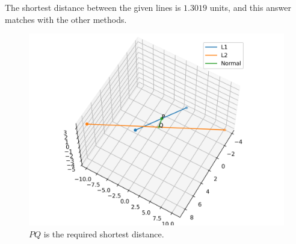 \documentclass[journal,12pt,twocolumn]{IEEEtran}
\begin{document}
\begin{enumerate}
The shortest distance between the given lines is $1.3019$ units, and this answer matches with the other methods.

\begin{figure}[!ht]
\centering
\includegraphics[width=\columnwidth]{./figs/skew.png}
\caption{$PQ$ is the required shortest distance.}
\end{figure}
\end{enumerate}
\end{document}
